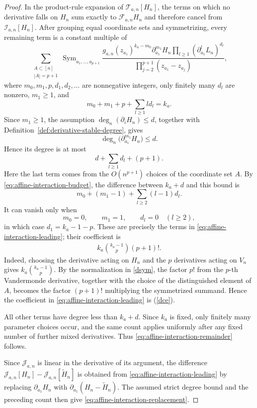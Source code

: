 \documentclass[11pt]{amsart}
\theoremstyle{plain}
\renewcommand\ell{l}
\numberwithin{equation}{section}
\numberwithin{theorem}{section}
\numberwithin{figure}{section}
\begin{document}
\begin{proof}
In the product-rule expansion of \(\mathscr T_{a,n}[H_n]\), the terms
on which no derivative falls on \(H_n\) sum exactly to
\(\mathcal F_{a,n}H_n\) and therefore cancel from
\(\mathscr I_{a,n}[H_n]\). After grouping equal coordinate sets and
symmetrizing, every remaining term is a constant multiple of
\[
\sum_{\substack{A\subset[n]\\ |A|=p+1}}
\operatorname{Sym}_{a_1,\ldots,a_{p+1}}
\frac{
    g_{a,n}(z_{a_1})^{k_a-m_0}
    \partial_{a_1}^{m_1}H_n
    \prod_{\ell\geq1}
        (\partial_{a_1}^{\ell}L_n)^{d_\ell}
}{
    \prod_{j=2}^{p+1}(z_{a_1}-z_{a_j})
},
\]
where \(m_0,m_1,p,d_1,d_2,\ldots\) are nonnegative integers, only
finitely many \(d_\ell\) are nonzero, \(m_1\geq1\), and
\begin{equation}
    m_0+m_1+p+\sum_{\ell\geq1}\ell d_\ell=k_a.
    \label{eq:affine-interaction-budget}
\end{equation}
Since \(m_1\geq1\), the assumption
\(\deg_n(\partial_iH_n)\leq d\), together with
Definition~\ref{def:derivative-stable-degree}, gives
\[
    \deg_n\bigl(\partial_{a_1}^{m_1}H_n\bigr)\leq d.
\] Hence its degree is at most
\[
    d+\sum_{\ell\geq1}d_\ell+(p+1).
\]
Here the last term comes from the \(O(n^{p+1})\) choices of the
coordinate set \(A\).
By \eqref{eq:affine-interaction-budget}, the difference between
\(k_a+d\) and this bound is
\[
    m_0+(m_1-1)
    +\sum_{\ell\geq2}(\ell-1)d_\ell.
\]
It can vanish only when
\[
    m_0=0,
    \qquad m_1=1,
    \qquad d_\ell=0\quad(\ell\geq2),
\]
in which case \(d_1=k_a-1-p\). These are precisely the terms in
\eqref{eq:affine-interaction-leading}; their coefficient is
\begin{align}
    k_a\binom{k_a-1}{p}(p+1)!.\label{dce}
\end{align}
Indeed, choosing the derivative acting on \(H_n\) and the \(p\)
derivatives acting on \(V_n\) gives
\(k_a\binom{k_a-1}{p}\). By the normalization in \eqref{dsym}, the
factor \(p!\) from the \(p\)-th Vandermonde derivative, together with
the choice of the distinguished element of \(A\), becomes the factor
\((p+1)!\) multiplying the symmetrized summand. Hence the coefficient
in \eqref{eq:affine-interaction-leading} is
(\ref{dce}).

All other terms have degree less than \(k_a+d\). Since \(k_a\) is
fixed, only finitely many parameter choices occur, and the same count
applies uniformly after any fixed number of further mixed derivatives.
Thus \eqref{eq:affine-interaction-remainder} follows. 

Since \(\mathscr J_{a,n}\) is linear in the derivative of its
argument, the difference
\(\mathscr J_{a,n}[H_n]-\mathscr J_{a,n}[\widetilde H_n]\) is obtained
from \eqref{eq:affine-interaction-leading} by replacing
\(\partial_{a_1}H_n\) with
\(\partial_{a_1}(H_n-\widetilde H_n)\). The assumed strict degree bound
and the preceding count then give
\eqref{eq:affine-interaction-replacement}.
\end{proof}
\endgroup
\end{document}
